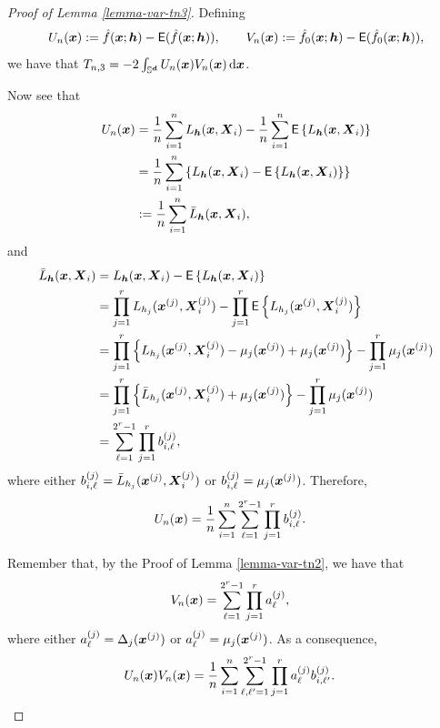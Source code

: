 \documentclass[oneside,11pt]{article}
\begin{document}
\begin{proof}[Proof of Lemma \ref{lemma-var-tn3}]
Defining
\[
    U_n(\boldsymbol{x}) := \hat f(\boldsymbol{x};{\boldsymbol{h}})-\mathsf{E}(\hat f(\boldsymbol{x};{\boldsymbol{h}})),
    \qquad
    V_n(\boldsymbol{x}) := \hat f_0(\boldsymbol{x};{\boldsymbol{h}})-\mathsf{E}(\hat f_0(\boldsymbol{x};{\boldsymbol{h}})),
\]
we have that $T_{n,3}=-2\int_{\mathbb{S}^{\boldsymbol{d}}} U_n(\boldsymbol{x})V_n(\boldsymbol{x})\,\mathrm{d}\boldsymbol{x}$.

Now see that
\begin{align*}
    U_n(\boldsymbol{x}) &=  \frac{1}{n} \sum_{i=1}^{n} L_{{\boldsymbol{h}}} (\boldsymbol{x},\boldsymbol{X}_i) -  \frac{1}{n} \sum_{i=1}^{n} \mathsf{E} \left\{L_{{\boldsymbol{h}}} (\boldsymbol{x},\boldsymbol{X}_i)\right\} \\
    &=  \frac{1}{n} \sum_{i=1}^{n} \left\{L_{{\boldsymbol{h}}} (\boldsymbol{x},\boldsymbol{X}_i) -  \mathsf{E} \left\{L_{{\boldsymbol{h}}} (\boldsymbol{x},\boldsymbol{X}_i)\right\}\right\} \\
    &:= \frac{1}{n} \sum_{i=1}^{n} \bar{L}_{{\boldsymbol{h}}} (\boldsymbol{x},\boldsymbol{X}_i),
\end{align*}
and
\begin{align*}
    \bar{L}_{{\boldsymbol{h}}} (\boldsymbol{x},\boldsymbol{X}_i) &= L_{{\boldsymbol{h}}} (\boldsymbol{x},\boldsymbol{X}_i) - \mathsf{E} \left\{L_{{\boldsymbol{h}}} (\boldsymbol{x},\boldsymbol{X}_i)\right\} \\
    &= \prod_{j=1}^r L_{h_j} (\boldsymbol{x}^{(j)},\boldsymbol{X}_i^{(j)}) - \prod_{j=1}^r \mathsf{E} \left\{L_{h_j} (\boldsymbol{x}^{(j)},\boldsymbol{X}_i^{(j)})\right\} \\
    &= \prod_{j=1}^r \left\{L_{h_j} (\boldsymbol{x}^{(j)},\boldsymbol{X}_i^{(j)}) - \mu_j(\boldsymbol{x}^{(j)}) + \mu_j(\boldsymbol{x}^{(j)})\right\} - \prod_{j=1}^r \mu_j(\boldsymbol{x}^{(j)}) \\
     &= \prod_{j=1}^r \left\{\bar{L}_{h_j} (\boldsymbol{x}^{(j)},\boldsymbol{X}_i^{(j)}) + \mu_j(\boldsymbol{x}^{(j)})\right\} - \prod_{j=1}^r \mu_j(\boldsymbol{x}^{(j)}) \\
    &= \sum_{\ell=1}^{2^r -1} \prod_{j=1}^r b_{i,\ell}^{(j)},
\end{align*}
where either $b_{i,\ell}^{(j)} = \bar{L}_{h_j} (\boldsymbol{x}^{(j)},\boldsymbol{X}_i^{(j)})$ or $b_{i,\ell}^{(j)} = \mu_j(\boldsymbol{x}^{(j)})$.
Therefore,
\begin{align*}
    U_n(\boldsymbol{x}) &= \frac{1}{n} \sum_{i=1}^{n} \sum_{\ell=1}^{2^r -1} \prod_{j=1}^r b_{i,\ell}^{(j)}.
\end{align*}

Remember that, by the Proof of Lemma \ref{lemma-var-tn2}, we have that
\begin{align*}
    V_n(\boldsymbol{x}) &= \sum_{\ell=1}^{2^r -1} \prod_{j=1}^{r} a_\ell^{(j)},
\end{align*}
where either $a_\ell^{(j)} = \Delta_j(\boldsymbol{x}^{(j)})$ or $a_\ell^{(j)} = \mu_j(\boldsymbol{x}^{(j)})$. As a consequence,
\begin{align*}
    U_n(\boldsymbol{x}) V_n(\boldsymbol{x}) &= \frac{1}{n} \sum_{i=1}^{n} \sum_{\ell,\ell'=1}^{2^r -1} \prod_{j=1}^r a_\ell^{(j)} b_{i,\ell'}^{(j)}.
\end{align*}


\end{proof}
\end{document}
